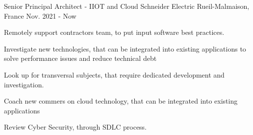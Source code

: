 

\begin{cventries}

  \cventry
    {Senior Principal Architect - IIOT and Cloud} %
    {Schneider Electric} %
    {Rueil-Malmaison, France} %
    {Nov. 2021 - Now} %
    {
      \begin{cvitems} %
      \item {Remotely support contractors team, to put input software best practices.}
      \item {Investigate new technologies, that can be integrated into existing applications to solve performance issues and reduce technical debt}
      \item {Look up for transversal subjects, that require dedicated development and investigation.}
      \item {Coach new commers on cloud technology, that can be integrated into existing applications}
      \item {Review Cyber Security, through SDLC process.}
      \end{cvitems}
    }


\end{cventries}
